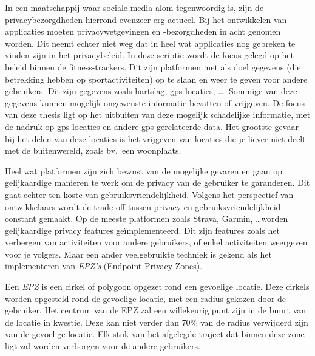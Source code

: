 In een maatschappij waar sociale media alom tegenwoordig is, zijn de
privacybezorgdheden hierrond evenzeer erg actueel. Bij het ontwikkelen van
applicaties moeten privacywetgevingen en -bezorgdheden in acht genomen worden.
Dit neemt echter niet weg dat in heel wat applicaties nog gebreken te vinden
zijn in het privacybeleid. In deze scriptie wordt de focus gelegd op het beleid
binnen de fitness-trackers. Dit zijn platformen met als doel gegevens (die
betrekking hebben op sportactiviteiten) op te slaan en weer te geven voor
andere gebruikers. Dit zijn gegevens zoals hartslag, gps-locaties, \ldots.
Sommige van deze gegevens kunnen mogelijk ongewenste informatie bevatten of
vrijgeven. De focus van deze thesis ligt op het uitbuiten van deze mogelijk
schadelijke informatie, met de nadruk op gps-locaties en andere
gps-gerelateerde data. Het grootste gevaar bij het delen van deze locaties is
het vrijgeven van locaties die je liever niet deelt met de buitenwereld, zoals
bv.\ een woonplaats.

Heel wat platformen zijn zich bewust van de mogelijke gevaren en gaan op
gelijkaardige manieren te werk om de privacy van de gebruiker te garanderen.
Dit gaat echter ten koste van gebruiksvriendelijkheid. Volgens het perspectief
van ontwikkelaars wordt de trade-off tussen privacy en gebruiksvriendelijkheid
constant gemaakt. Op de meeste platformen zoals Strava, Garmin, \ldots worden
gelijkaardige privacy features geïmplementeerd. Dit zijn features zoals het
verbergen van activiteiten voor andere gebruikers, of enkel activiteiten
weergeven voor je volgers. Maar een ander veelgebruikte techniek is gekend als
het implementeren van \textit{EPZ's} (Endpoint Privacy Zones).

Een \textit{EPZ} is een cirkel of polygoon opgezet rond een gevoelige locatie.
Deze cirkels worden opgesteld rond de gevoelige locatie, met een radius gekozen
door de gebruiker. Het centrum van de EPZ zal een willekeurig punt zijn in de
buurt van de locatie in kwestie. Deze kan niet verder dan 70\% van de radius
verwijderd zijn van de gevoelige locatie. Elk stuk van het afgelegde traject
dat binnen deze zone ligt zal worden verborgen voor de andere gebruikers.

